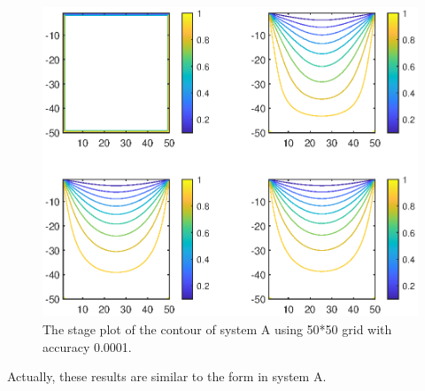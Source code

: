 \documentclass[12pt]{report}
\begin{document}
\begin{figure}[H]
    \centering
    \includegraphics[width=0.8\linewidth]{BStageContour.eps}
    \caption{The stage plot of the contour of system A using 50*50 grid with accuracy 0.0001.}
\end{figure}
Actually, these results are similar to the form in system A.
\end{document}
